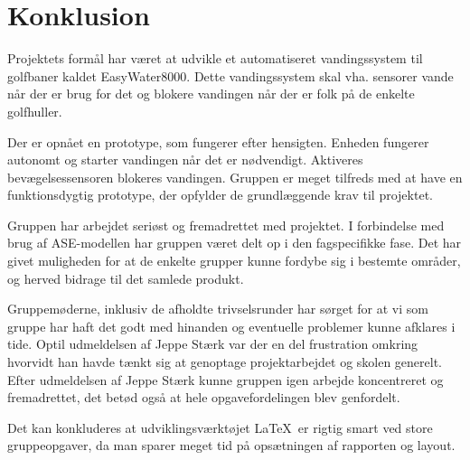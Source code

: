 \chapter{Konklusion}

Projektets formål har været at udvikle et automatiseret vandingssystem til golfbaner kaldet EasyWater8000. Dette vandingssystem skal vha. sensorer vande når der er brug for det og blokere vandingen når der er folk på de enkelte golfhuller. 

Der er opnået en prototype, som fungerer efter hensigten. Enheden fungerer autonomt og starter vandingen når det er nødvendigt. Aktiveres bevægelsessensoren blokeres vandingen. Gruppen er meget tilfreds med at have en funktionsdygtig  prototype, der opfylder de grundlæggende krav til projektet.  

Gruppen har arbejdet seriøst og fremadrettet med projektet. I forbindelse med brug af ASE-modellen har gruppen været delt op i den fagspecifikke fase. Det har givet muligheden for at de enkelte grupper kunne fordybe sig i bestemte områder, og herved bidrage til det samlede produkt.

Gruppemøderne, inklusiv de afholdte trivselsrunder har sørget for at vi som gruppe har haft det godt med hinanden og eventuelle problemer kunne afklares i tide. Optil udmeldelsen af Jeppe Stærk var der en del frustration omkring hvorvidt han havde tænkt sig at genoptage projektarbejdet og skolen generelt. Efter udmeldelsen af Jeppe Stærk kunne gruppen igen arbejde koncentreret og fremadrettet, det betød også at hele opgavefordelingen blev genfordelt.  

Det kan konkluderes at udviklingsværktøjet \LaTeX \ er rigtig smart ved store gruppeopgaver, da man sparer meget tid på opsætningen af rapporten og layout.






